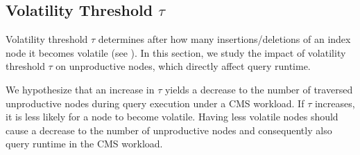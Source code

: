 \documentclass[abstracton,12pt]{scrartcl}
\theoremstyle{definition}
\begin{document}




\subsection{Volatility Threshold $\tau$}

\label{sec:threshold}

Volatility threshold $\tau$ determines after how many insertions/deletions of an index node
it becomes volatile (see ). In this section, we study the impact of
volatility threshold $\tau$ on unproductive nodes, which directly affect query runtime.

We hypothesize that an increase in $\tau$ yields a decrease to the number of
traversed unproductive nodes during query execution under a CMS workload. If
$\tau$ increases, it is
less likely for a node to become volatile. Having less volatile nodes should
cause a decrease to the number of unproductive nodes and consequently also query
runtime in the CMS workload.

\end{document}

